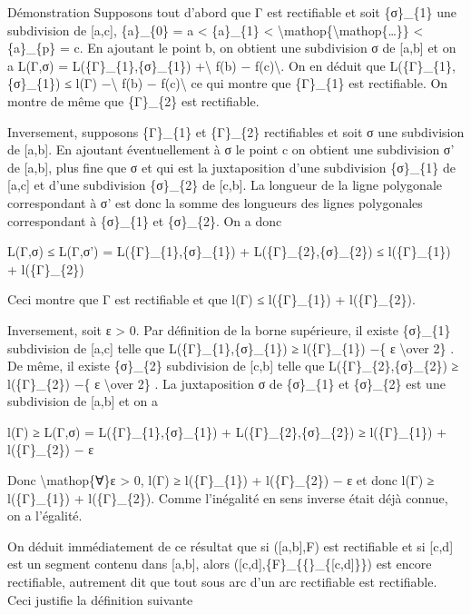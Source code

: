 \documentclass[]{article}
\begin{document}
Démonstration Supposons tout d'abord que Γ est rectifiable et soit
\{σ\}\_\{1\} une subdivision de {[}a,c{]}, \{a\}\_\{0\} = a \textless{}
\{a\}\_\{1\} \textless{}
\textbackslash{}mathop\{\textbackslash{}mathop\{\ldots{}\}\} \textless{}
\{a\}\_\{p\} = c. En ajoutant le point b, on obtient une subdivision σ
de {[}a,b{]} et on a L(Γ,σ) = L(\{Γ\}\_\{1\},\{σ\}\_\{1\})
+\textbackslash{}\textbar{} f(b) − f(c)\textbackslash{}\textbar{}. On en
déduit que L(\{Γ\}\_\{1\},\{σ\}\_\{1\}) ≤ l(Γ)
−\textbackslash{}\textbar{} f(b) − f(c)\textbackslash{}\textbar{} ce qui
montre que \{Γ\}\_\{1\} est rectifiable. On montre de même que
\{Γ\}\_\{2\} est rectifiable.

Inversement, supposons \{Γ\}\_\{1\} et \{Γ\}\_\{2\} rectifiables et soit
σ une subdivision de {[}a,b{]}. En ajoutant éventuellement à σ le point
c on obtient une subdivision σ' de {[}a,b{]}, plus fine que σ et qui est
la juxtaposition d'une subdivision \{σ\}\_\{1\} de {[}a,c{]} et d'une
subdivision \{σ\}\_\{2\} de {[}c,b{]}. La longueur de la ligne
polygonale correspondant à σ' est donc la somme des longueurs des lignes
polygonales correspondant à \{σ\}\_\{1\} et \{σ\}\_\{2\}. On a donc

L(Γ,σ) ≤ L(Γ,σ') = L(\{Γ\}\_\{1\},\{σ\}\_\{1\}) +
L(\{Γ\}\_\{2\},\{σ\}\_\{2\}) ≤ l(\{Γ\}\_\{1\}) + l(\{Γ\}\_\{2\})

Ceci montre que Γ est rectifiable et que l(Γ) ≤ l(\{Γ\}\_\{1\}) +
l(\{Γ\}\_\{2\}).

Inversement, soit ε \textgreater{} 0. Par définition de la borne
supérieure, il existe \{σ\}\_\{1\} subdivision de {[}a,c{]} telle que
L(\{Γ\}\_\{1\},\{σ\}\_\{1\}) ≥ l(\{Γ\}\_\{1\}) −\{ ε
\textbackslash{}over 2\} . De même, il existe \{σ\}\_\{2\} subdivision
de {[}c,b{]} telle que L(\{Γ\}\_\{2\},\{σ\}\_\{2\}) ≥ l(\{Γ\}\_\{2\})
−\{ ε \textbackslash{}over 2\} . La juxtaposition σ de \{σ\}\_\{1\} et
\{σ\}\_\{2\} est une subdivision de {[}a,b{]} et on a

l(Γ) ≥ L(Γ,σ) = L(\{Γ\}\_\{1\},\{σ\}\_\{1\}) +
L(\{Γ\}\_\{2\},\{σ\}\_\{2\}) ≥ l(\{Γ\}\_\{1\}) + l(\{Γ\}\_\{2\}) − ε

Donc \textbackslash{}mathop\{∀\}ε \textgreater{} 0, l(Γ) ≥
l(\{Γ\}\_\{1\}) + l(\{Γ\}\_\{2\}) − ε et donc l(Γ) ≥ l(\{Γ\}\_\{1\}) +
l(\{Γ\}\_\{2\}). Comme l'inégalité en sens inverse était déjà connue, on
a l'égalité.

On déduit immédiatement de ce résultat que si ({[}a,b{]},F) est
rectifiable et si {[}c,d{]} est un segment contenu dans {[}a,b{]}, alors
({[}c,d{]},\{F\}\_\{\{\textbar{}\}\_\{{[}c,d{]}\}\}) est encore
rectifiable, autrement dit que tout sous arc d'un arc rectifiable est
rectifiable. Ceci justifie la définition suivante
\end{document}
